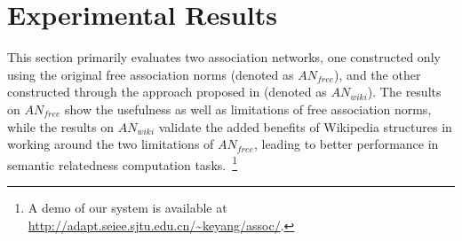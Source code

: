 \section{Experimental Results}
\label{sec:eval}
%
%


This section primarily evaluates two association networks, one
constructed only using the original free association norms (denoted
as $AN_{free}$), and the other constructed through the approach
proposed in  (denoted as $AN_{wiki}$). The
results on $AN_{free}$ show the usefulness as well as limitations of free association
norms, while the results
on $AN_{wiki}$ validate the added benefits of Wikipedia structures 
in working around the two limitations of $AN_{free}$, leading to
better performance in semantic relatedness computation tasks.~\footnote{A demo of our system is available at
\url{http://adapt.seiee.sjtu.edu.cn/~keyang/assoc/}.}

